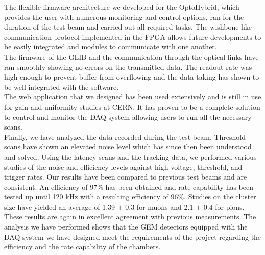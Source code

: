     The flexible firmware architecture we developed for the OptoHybrid, which provides the user with numerous monitoring and control options, ran for the duration of the test beam and carried out all required tasks. The wishbone-like communication protocol implemented in the FPGA allows future developments to be easily integrated and modules to communicate with one another. \\

    The firmware of the GLIB and the communication through the optical links have ran smoothly showing no errors on the transmitted data. The readout rate was high enough to prevent buffer from overflowing and the data taking has shown to be well integrated with the software. \\

    The web application that we designed has been used extensively and is still in use for gain and uniformity studies at CERN. It has proven to be a complete solution to control and monitor the DAQ system allowing users to run all the necessary scans. \\

    Finally, we have analyzed the data recorded during the test beam. Threshold scans have shown an elevated noise level which has since then been understood and solved. Using the latency scans and the tracking data, we performed various studies of the noise and efficiency levels against high-voltage, threshold, and trigger rates. Our results have been compared to previous test beams and are consistent. An efficiency of 97\% has been obtained and rate capability has been tested up until 120 kHz with a resulting efficiency of 96\%. Studies on the cluster size have yielded an average of 1.39 $\pm$ 0.3 for muons and 2.1 $\pm$ 0.4 for pions. These results are again in excellent agreement with previous measurements. The analysis we have performed shows that the GEM detectors equipped with the DAQ system we have designed meet the requirements of the project regarding the efficiency and the rate capability of the chambers.
